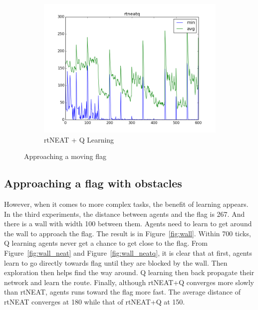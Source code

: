 \documentclass[letterpaper]{article}
\begin{document}
\begin{figure}[ht]
\begin{subfigure}{0.7\columnwidth}
  \includegraphics[width=\columnwidth]{moving_rtneatq.png}
  \caption{rtNEAT + Q Learning}
  \label{fig:moving_neatq}
\end{subfigure}
\caption{Approaching a moving flag}
\label{fig:moving}
\end{figure}


\subsection{Approaching a flag with obstacles}
However, when it comes to more complex tasks, the benefit of learning appears. In the third experiments, the distance between agents and the flag is 267. And there is a wall with width 100 between them. Agents need to learn to get around the wall to approach the flag. The result is in Figure~\ref{fig:wall}. Within 700 ticks, Q learning agents never get a chance to get close to the flag. From Figure~\ref{fig:wall_neat} and Figure~\ref{fig:wall_neatq}, it is clear that at first, agents learn to go directly towards flag until they are blocked by the wall. Then exploration then helps find the way around. Q learning then back propagate their network and learn the route. Finally, although rtNEAT+Q converges more slowly than rtNEAT, agents runs toward the flag more fast. The average distance of rtNEAT converges at 180 while that of rtNEAT+Q at 150. 
\end{document}
